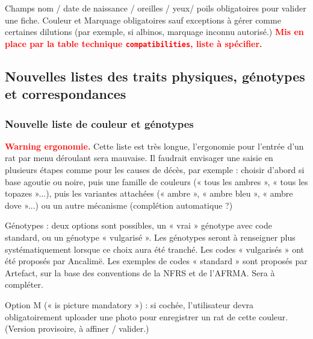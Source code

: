 \documentclass[a4paper,10pt]{article}
\newcommand\desire[1]{\noindent\textbf{\textcolor{red}{#1}}}
\begin{document}
Champs nom / date de naissance / oreilles / yeux/ poils obligatoires pour valider une fiche. Couleur et Marquage obligatoires sauf exceptions à gérer comme certaines dilutions (par exemple, si albinos, marquage inconnu autorisé.) \desire{Mis en place par la table technique \texttt{compatibilities}, liste à spécifier.}

\subsection{Nouvelles listes des traits physiques, génotypes et correspondances}

\subsubsection{Nouvelle liste de couleur et génotypes}
\desire{Warning ergonomie.} Cette liste est très longue, l'ergonomie pour l'entrée d'un rat par menu déroulant sera mauvaise. Il faudrait envisager une saisie en plusieurs étapes comme pour les causes de décès, par exemple : choisir d'abord si base agoutie ou noire, puis une famille de couleurs (« tous les ambres », « tous les topazes »...), puis les variantes attachées (« ambre », « ambre bleu », « ambre dove »...) ou un autre mécanisme (complétion automatique ?)   

Génotypes : deux options sont possibles, un « vrai » génotype avec code standard, ou un génotype « vulgarisé ». Les génotypes seront à renseigner plus systématiquement lorsque ce choix aura été tranché. Les codes « vulgarisés » ont été proposés par Ancalimë. Les exemples de codes « standard » sont proposés par Artefact, sur la base des conventions de la NFRS et de l'AFRMA. Sera à compléter.  

Option M (« is picture mandatory ») : si cochée, l'utilisateur devra obligatoirement uploader une photo pour enregistrer un rat de cette couleur. (Version provisoire, à affiner / valider.)
\end{document}
